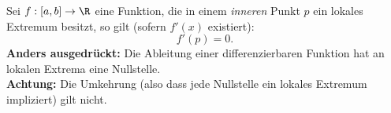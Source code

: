 Sei $f: [a, b] \to \R$ eine Funktion, die in einem \textit{inneren} Punkt $p$ ein lokales Extremum besitzt, so gilt (sofern $f'(x)$ existiert):
$$f'(p) = 0.$$
\textbf{Anders ausgedrückt:} Die Ableitung einer differenzierbaren Funktion hat an lokalen Extrema eine Nullstelle.\\
\textbf{Achtung:} Die Umkehrung (also dass jede Nullstelle ein lokales Extremum impliziert) gilt nicht.